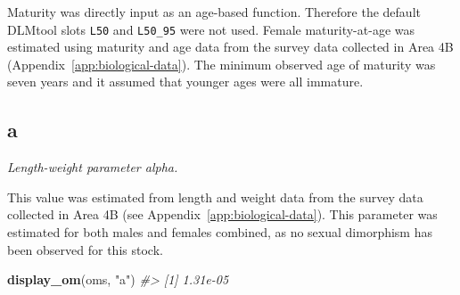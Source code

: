 \documentclass[11pt]{book}
\newenvironment{Shaded}{}{}
\newcommand{\KeywordTok}[1]{\textcolor[rgb]{0.00,0.44,0.13}{\textbf{{#1}}}}
\newcommand{\DecValTok}[1]{\textcolor[rgb]{0.25,0.63,0.44}{{#1}}}
\newcommand{\FloatTok}[1]{\textcolor[rgb]{0.25,0.63,0.44}{{#1}}}
\newcommand{\StringTok}[1]{\textcolor[rgb]{0.25,0.44,0.63}{{#1}}}
\newcommand{\CommentTok}[1]{\textcolor[rgb]{0.38,0.63,0.69}{\textit{{#1}}}}
\newcommand{\NormalTok}[1]{{#1}}
\newcommand{\OperatorTok}[1]{\textcolor[rgb]{0.00,0.44,0.13}{\textbf{{#1}}}}
\newcommand{\ControlFlowTok}[1]{\textcolor[rgb]{0.00,0.44,0.13}{\textbf{{#1}}}}
\begin{document}
Maturity was directly input as an age-based function. Therefore the default DLMtool slots \texttt{L50} and \texttt{L50\_95} were not used. Female maturity-at-age was estimated using maturity and age data from the survey data collected in Area 4B (Appendix~\ref{app:biological-data}). The minimum observed age of maturity was seven years and it assumed that younger ages were all immature.
\begin{Shaded}
\end{Shaded}
\label{app:desc-stock-a-yelloweye}
\subsection{a}

\emph{Length-weight parameter alpha.}

This value was estimated from length and weight data from the survey data collected in Area 4B (see Appendix~\ref{app:biological-data}). This parameter was estimated for both males and females combined, as no sexual dimorphism has been observed for this stock.
\begin{Shaded}
\begin{Highlighting}[]
\KeywordTok{display_om}\NormalTok{(oms, }\StringTok{"a"}\NormalTok{)}
\CommentTok{#> [1] 1.31e-05}
\end{Highlighting}
\end{Shaded}
\label{app:desc-stock-b-yelloweye}
\end{document}
